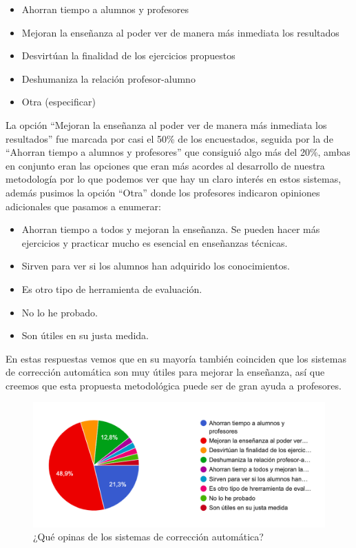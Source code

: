 \begin{enumerate}
\begin{itemize}
    \item Ahorran tiempo a alumnos y profesores
    \item Mejoran la enseñanza al poder ver de manera más inmediata los resultados
    \item Desvirtúan la finalidad de los ejercicios propuestos
    \item Deshumaniza la relación profesor-alumno
    \item Otra (especificar)
\end{itemize}

La opción ``Mejoran la enseñanza al poder ver de manera más inmediata los resultados'' fue marcada por casi el 50\% de los encuestados, seguida por la de ``Ahorran tiempo a alumnos y profesores'' que consiguió algo más del 20\%, ambas en conjunto eran las opciones que eran más acordes al desarrollo de nuestra metodología por lo que podemos ver que hay un claro interés en estos sistemas, además pusimos la opción ``Otra'' donde los profesores indicaron opiniones adicionales que pasamos a enumerar:

\begin{itemize}
    \item Ahorran tiempo a todos y mejoran la enseñanza. Se pueden hacer más ejercicios y practicar mucho es esencial en enseñanzas técnicas.
    \item Sirven para ver si los alumnos han adquirido los conocimientos.
    \item Es otro tipo de herramienta de evaluación.
    \item No lo he probado.
    \item Son útiles en su justa medida.
\end{itemize}

En estas respuestas vemos que en su mayoría también coinciden que los sistemas de corrección automática son muy útiles para mejorar la enseñanza, así que creemos que esta propuesta metodológica puede ser de gran ayuda a profesores.

\begin{figure}[H]
\centering
\includegraphics[width=1.0\textwidth]{../images/quiz_6}
\caption{¿Qué opinas de los sistemas de corrección automática?}
\label{fig:quiz_6}
\end{figure}


\end{enumerate}
